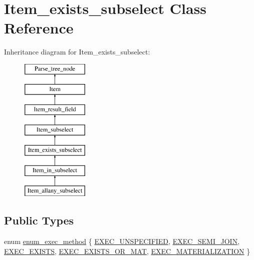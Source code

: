 \hypertarget{classItem__exists__subselect}{}\section{Item\+\_\+exists\+\_\+subselect Class Reference}
\label{classItem__exists__subselect}
Inheritance diagram for Item\+\_\+exists\+\_\+subselect\+:\begin{figure}[H]
\begin{center}
\leavevmode
\includegraphics[height=7.000000cm]{classItem__exists__subselect}
\end{center}
\end{figure}
\subsection*{Public Types}
\begin{DoxyCompactItemize}
\item 
enum \mbox{\hyperlink{classItem__exists__subselect_aa110ca13dba0d9c620f5f72e6bad798e}{enum\+\_\+exec\+\_\+method}} \{ \newline
\mbox{\hyperlink{classItem__exists__subselect_aa110ca13dba0d9c620f5f72e6bad798ea833fc1d0c46e3445659e25b5bfa2535a}{E\+X\+E\+C\+\_\+\+U\+N\+S\+P\+E\+C\+I\+F\+I\+ED}}, 
\mbox{\hyperlink{classItem__exists__subselect_aa110ca13dba0d9c620f5f72e6bad798ea4b5180f7e3e637ac8cfa00c335114602}{E\+X\+E\+C\+\_\+\+S\+E\+M\+I\+\_\+\+J\+O\+IN}}, 
\mbox{\hyperlink{classItem__exists__subselect_aa110ca13dba0d9c620f5f72e6bad798ea4fcb93c157dbc3a0c588f34882f943aa}{E\+X\+E\+C\+\_\+\+E\+X\+I\+S\+TS}}, 
\mbox{\hyperlink{classItem__exists__subselect_aa110ca13dba0d9c620f5f72e6bad798ea2bdf0cc1ee5a7f83d77f9cf9b244a98c}{E\+X\+E\+C\+\_\+\+E\+X\+I\+S\+T\+S\+\_\+\+O\+R\+\_\+\+M\+AT}}, 
\newline
\mbox{\hyperlink{classItem__exists__subselect_aa110ca13dba0d9c620f5f72e6bad798ea9470bc3d50334cae4015e6cf9e6063ec}{E\+X\+E\+C\+\_\+\+M\+A\+T\+E\+R\+I\+A\+L\+I\+Z\+A\+T\+I\+ON}}
 \}
\end{DoxyCompactItemize}
